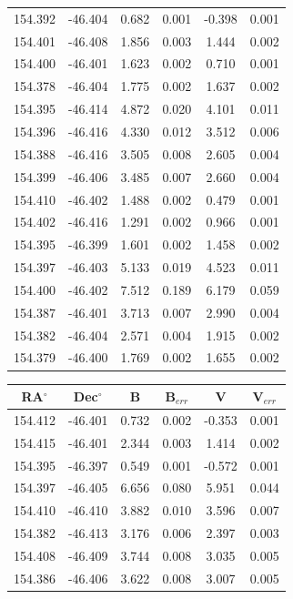 \documentclass[11pt]{article}
\begin{document}
\begin{table}
\begin{minipage}{0.48\paperwidth}
\begin{tabular}{cccccc}
154.392 & -46.404 & 0.682 & 0.001 & -0.398 & 0.001 \\
154.401 & -46.408 & 1.856 & 0.003 & 1.444 & 0.002 \\
154.400 & -46.401 & 1.623 & 0.002 & 0.710 & 0.001 \\
154.378 & -46.404 & 1.775 & 0.002 & 1.637 & 0.002 \\
154.395 & -46.414 & 4.872 & 0.020 & 4.101 & 0.011 \\
154.396 & -46.416 & 4.330 & 0.012 & 3.512 & 0.006 \\
154.388 & -46.416 & 3.505 & 0.008 & 2.605 & 0.004 \\
154.399 & -46.406 & 3.485 & 0.007 & 2.660 & 0.004 \\
154.410 & -46.402 & 1.488 & 0.002 & 0.479 & 0.001 \\
154.402 & -46.416 & 1.291 & 0.002 & 0.966 & 0.001 \\
154.395 & -46.399 & 1.601 & 0.002 & 1.458 & 0.002 \\
154.397 & -46.403 & 5.133 & 0.019 & 4.523 & 0.011 \\
154.400 & -46.402 & 7.512 & 0.189 & 6.179 & 0.059 \\
154.387 & -46.401 & 3.713 & 0.007 & 2.990 & 0.004 \\
154.382 & -46.404 & 2.571 & 0.004 & 1.915 & 0.002 \\
154.379 & -46.400 & 1.769 & 0.002 & 1.655 & 0.002 \\
\bottomrule
\end{tabular}
\end{minipage}%
\hfill
\begin{minipage}{0.48\paperwidth}
\begin{tabular}{cccccc}
\toprule
RA$^{\circ}$ & Dec$^{\circ}$ & B & B$_{err}$ & V & V$_{err}$ \\
\midrule
154.412 & -46.401 & 0.732 & 0.002 & -0.353 & 0.001 \\
154.415 & -46.401 & 2.344 & 0.003 & 1.414 & 0.002 \\
154.395 & -46.397 & 0.549 & 0.001 & -0.572 & 0.001 \\
154.397 & -46.405 & 6.656 & 0.080 & 5.951 & 0.044 \\
154.410 & -46.410 & 3.882 & 0.010 & 3.596 & 0.007 \\
154.382 & -46.413 & 3.176 & 0.006 & 2.397 & 0.003 \\
154.408 & -46.409 & 3.744 & 0.008 & 3.035 & 0.005 \\
154.386 & -46.406 & 3.622 & 0.008 & 3.007 & 0.005 \\

\end{tabular}
\end{minipage}
\end{table}
\end{document}
